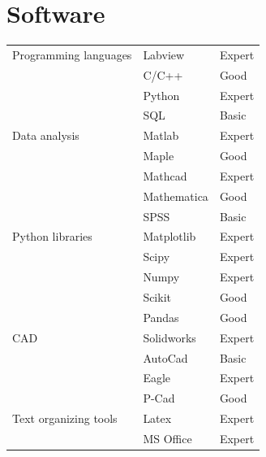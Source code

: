 \documentclass[a4paper,10pt]{article}
\begin{document}
\section*{Software}
\begin{tabular}{l|l|l}
Programming languages & Labview  & Expert\\
 & C/C++ & Good  \\ 
 & Python  & Expert\\
 & SQL  & Basic\\
\hline
Data analysis & Matlab  & Expert\\
 & Maple & Good  \\ 
 & Mathcad  & Expert\\
 & Mathematica  & Good\\
  & SPSS  & Basic\\
\hline
Python libraries & Matplotlib  & Expert\\
 & Scipy & Expert  \\ 
 & Numpy  & Expert\\
 & Scikit  & Good\\
 & Pandas  & Good\\
\hline
CAD & Solidworks  & Expert\\
 & AutoCad & Basic  \\ 
 & Eagle  & Expert\\
 & P-Cad  & Good\\
\hline
Text organizing tools & Latex  & Expert\\
 & MS Office & Expert  \\ 

\end{tabular}

\end{document}
